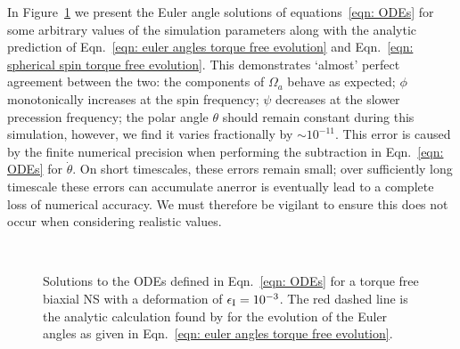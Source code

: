 \documentclass[../full_thesis/full_thesis.tex]{subfiles}
\begin{document}
In Figure~\ref{fig: biaxial body no torque} we present the Euler angle solutions
of equations~\eqref{eqn: ODEs} for some arbitrary values of the simulation
parameters along with the analytic prediction of Eqn.~\eqref{eqn: euler angles
torque free evolution} and Eqn.~\eqref{eqn: spherical spin torque free
evolution}. This demonstrates `almost' perfect agreement between the two: the
components of $\Omega_a$ behave as expected;
$\phi$ monotonically
increases at the spin frequency; $\psi$ decreases at the slower precession
frequency; the polar angle $\theta$ should remain constant during this
simulation, however, we find it varies fractionally by
$\sim 10^{-11}$.  This error is caused by the finite numerical precision when
performing the subtraction in Eqn.~\eqref{eqn: ODEs} for $\dot{\theta}$. On
short timescales, these errors remain small; over sufficiently long timescale
these errors can accumulate anerror is eventually lead to a complete loss of numerical
accuracy. We must therefore be vigilant to ensure this does not occur when
considering realistic values.
\afterpage{\clearpage}
\begin{figure}[p]
    \centering
{} \\
\caption{Solutions to the ODEs defined in Eqn.~\eqref{eqn: ODEs} for a
torque free biaxial NS with a deformation of $\epsilon_{\mathrm{I}} = 10^{-3}$. The red
dashed line is the analytic calculation found by \citet{Jones2001} for the
evolution of the Euler angles as given in Eqn.~\eqref{eqn: euler angles torque free evolution}.}
\label{fig: biaxial body no torque}
\end{figure}
\end{document}
